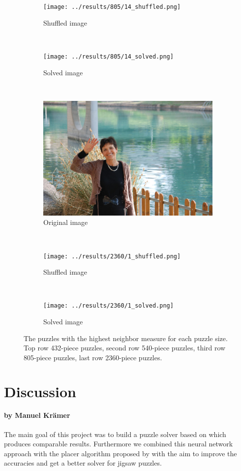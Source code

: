 \documentclass[11pt]{report}
\begin{document}
\begin{figure}
\begin{subfigure}[b]{0.3\textwidth}
		\texttt{[image: ../results/805/14\_shuffled.png]}
		\caption{Shuffled image}
	\end{subfigure}
	~
	\begin{subfigure}[b]{0.3\textwidth}
		\texttt{[image: ../results/805/14\_solved.png]}
		\caption{Solved image}
	\end{subfigure}
   ~
  \begin{subfigure}[b]{0.3\textwidth}
		\includegraphics[width=\textwidth]{../imData/2360/1.jpg}
		\caption{Original image}
	\end{subfigure}
	~
	\begin{subfigure}[b]{0.3\textwidth}
		\texttt{[image: ../results/2360/1\_shuffled.png]}
		\caption{Shuffled image}
	\end{subfigure}
	~
	\begin{subfigure}[b]{0.3\textwidth}
		\texttt{[image: ../results/2360/1\_solved.png]}
		\caption{Solved image}
	\end{subfigure}
	\caption{The puzzles with the highest neighbor measure for each puzzle size.
    Top row 432-piece puzzles, second row 540-piece puzzles, third row 805-piece
    puzzles, last row 2360-piece puzzles.}
	\label{fig:neighborMeasure}
\end{figure}

\chapter{Discussion}
\subsubsection*{by Manuel Krämer}

The main goal of this project was to build a puzzle solver based on \cite{sholomon2016dnn} which produces comparable results. Furthermore we combined this neural network approach with the placer algorithm proposed by \cite{Paikin2015} with the aim to improve the accuracies and get a better solver for jigsaw puzzles.
\end{document}
